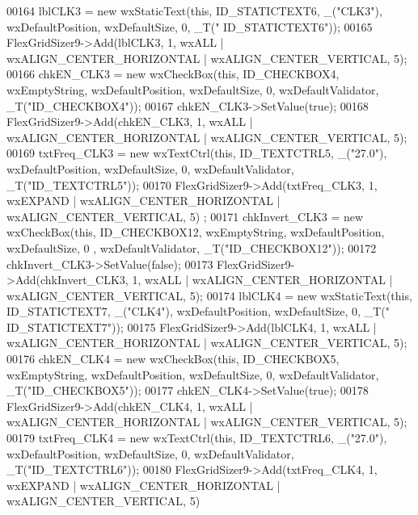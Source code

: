 \begin{DoxyCode}
00164     lblCLK3 = \textcolor{keyword}{new} wxStaticText(\textcolor{keyword}{this}, ID\_STATICTEXT6, \_(\textcolor{stringliteral}{"CLK3"}), wxDefaultPosition, wxDefaultSize, 0, \_T(\textcolor{stringliteral}{"
      ID\_STATICTEXT6"}));
00165     FlexGridSizer9->Add(lblCLK3, 1, wxALL | wxALIGN\_CENTER\_HORIZONTAL | wxALIGN\_CENTER\_VERTICAL, 5);
00166     chkEN\_CLK3 = \textcolor{keyword}{new} wxCheckBox(\textcolor{keyword}{this}, ID\_CHECKBOX4, wxEmptyString, wxDefaultPosition, wxDefaultSize, 0, 
      wxDefaultValidator, \_T(\textcolor{stringliteral}{"ID\_CHECKBOX4"}));
00167     chkEN\_CLK3->SetValue(\textcolor{keyword}{true});
00168     FlexGridSizer9->Add(chkEN\_CLK3, 1, wxALL | wxALIGN\_CENTER\_HORIZONTAL | wxALIGN\_CENTER\_VERTICAL, 5);
00169     txtFreq\_CLK3 = \textcolor{keyword}{new} wxTextCtrl(\textcolor{keyword}{this}, ID\_TEXTCTRL5, \_(\textcolor{stringliteral}{"27.0"}), wxDefaultPosition, wxDefaultSize, 0, 
      wxDefaultValidator, \_T(\textcolor{stringliteral}{"ID\_TEXTCTRL5"}));
00170     FlexGridSizer9->Add(txtFreq\_CLK3, 1, wxEXPAND | wxALIGN\_CENTER\_HORIZONTAL | wxALIGN\_CENTER\_VERTICAL, 5)
      ;
00171     chkInvert\_CLK3 = \textcolor{keyword}{new} wxCheckBox(\textcolor{keyword}{this}, ID\_CHECKBOX12, wxEmptyString, wxDefaultPosition, wxDefaultSize, 0
      , wxDefaultValidator, \_T(\textcolor{stringliteral}{"ID\_CHECKBOX12"}));
00172     chkInvert\_CLK3->SetValue(\textcolor{keyword}{false});
00173     FlexGridSizer9->Add(chkInvert\_CLK3, 1, wxALL | wxALIGN\_CENTER\_HORIZONTAL | wxALIGN\_CENTER\_VERTICAL, 5);
00174     lblCLK4 = \textcolor{keyword}{new} wxStaticText(\textcolor{keyword}{this}, ID\_STATICTEXT7, \_(\textcolor{stringliteral}{"CLK4"}), wxDefaultPosition, wxDefaultSize, 0, \_T(\textcolor{stringliteral}{"
      ID\_STATICTEXT7"}));
00175     FlexGridSizer9->Add(lblCLK4, 1, wxALL | wxALIGN\_CENTER\_HORIZONTAL | wxALIGN\_CENTER\_VERTICAL, 5);
00176     chkEN\_CLK4 = \textcolor{keyword}{new} wxCheckBox(\textcolor{keyword}{this}, ID\_CHECKBOX5, wxEmptyString, wxDefaultPosition, wxDefaultSize, 0, 
      wxDefaultValidator, \_T(\textcolor{stringliteral}{"ID\_CHECKBOX5"}));
00177     chkEN\_CLK4->SetValue(\textcolor{keyword}{true});
00178     FlexGridSizer9->Add(chkEN\_CLK4, 1, wxALL | wxALIGN\_CENTER\_HORIZONTAL | wxALIGN\_CENTER\_VERTICAL, 5);
00179     txtFreq\_CLK4 = \textcolor{keyword}{new} wxTextCtrl(\textcolor{keyword}{this}, ID\_TEXTCTRL6, \_(\textcolor{stringliteral}{"27.0"}), wxDefaultPosition, wxDefaultSize, 0, 
      wxDefaultValidator, \_T(\textcolor{stringliteral}{"ID\_TEXTCTRL6"}));
00180     FlexGridSizer9->Add(txtFreq\_CLK4, 1, wxEXPAND | wxALIGN\_CENTER\_HORIZONTAL | wxALIGN\_CENTER\_VERTICAL, 5)

\end{DoxyCode}
